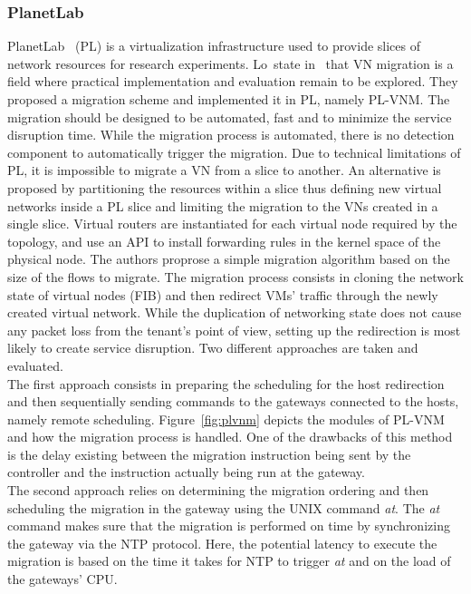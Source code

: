 \subsubsection{PlanetLab}
PlanetLab~\cite{Chun2003d} (PL) is a virtualization infrastructure used to provide slices of network resources for research experiments. Lo~\etal state in~\cite{Lo2014} that VN migration is a field where practical implementation and evaluation remain to be explored. They proposed a migration scheme and implemented it in PL, namely PL-VNM. The migration should be designed to be automated, fast and to minimize the service disruption time. While the migration process is automated, there is no detection component to automatically trigger the migration. Due to technical limitations of PL, it is impossible to migrate a VN from a slice to another. An alternative is proposed by partitioning the resources within a slice thus defining new virtual networks inside a PL slice and limiting the migration to the VNs created in a single slice. Virtual routers are instantiated for each virtual node required by the topology, and use an API to install forwarding rules in the kernel space of the physical node.
The authors proprose a simple migration algorithm based on the size of the flows to migrate.
The migration process consists in cloning the network state of virtual nodes (\ie FIB) and then  redirect VMs' traffic through the newly created virtual network.
While the duplication of networking state does not cause any packet loss from the tenant's point of view, setting up the redirection is most likely to create service disruption.
Two different approaches are taken and evaluated.\\
The first approach consists in preparing the scheduling for the host redirection and then sequentially sending commands to the gateways connected to the hosts, namely remote scheduling.
Figure~\ref{fig:plvnm} depicts the modules of PL-VNM and how the migration process is handled.
One of the drawbacks of this method is the delay existing between the migration instruction being sent by the controller and the instruction actually being run at the gateway.\\
The second approach relies on determining the migration ordering and then scheduling the migration in the gateway using the UNIX command \textit{at}. The \textit{at} command makes sure that the migration is performed on time by synchronizing the gateway via the NTP protocol. Here, the potential latency to execute the migration is based on the time it takes for NTP to trigger \textit{at} and on the load of the gateways' CPU.
